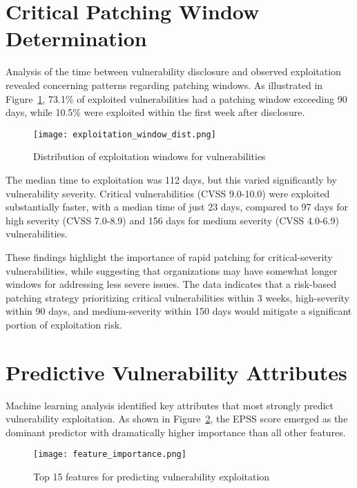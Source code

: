 \documentclass[runningheads]{llncs}
\begin{document}
\section{Critical Patching Window Determination}
Analysis of the time between vulnerability disclosure and observed exploitation revealed concerning patterns regarding patching windows. As illustrated in Figure~\ref{fig:patching_window}, 73.1\% of exploited vulnerabilities had a patching window exceeding 90 days, while 10.5\% were exploited within the first week after disclosure.

\begin{figure}[htbp]
\centering
\texttt{[image: exploitation\_window\_dist.png]}
\caption{Distribution of exploitation windows for vulnerabilities}
\label{fig:patching_window}
\end{figure}

The median time to exploitation was 112 days, but this varied significantly by vulnerability severity. Critical vulnerabilities (CVSS 9.0-10.0) were exploited substantially faster, with a median time of just 23 days, compared to 97 days for high severity (CVSS 7.0-8.9) and 156 days for medium severity (CVSS 4.0-6.9) vulnerabilities.

These findings highlight the importance of rapid patching for critical-severity vulnerabilities, while suggesting that organizations may have somewhat longer windows for addressing less severe issues. The data indicates that a risk-based patching strategy prioritizing critical vulnerabilities within 3 weeks, high-severity within 90 days, and medium-severity within 150 days would mitigate a significant portion of exploitation risk.

\section{Predictive Vulnerability Attributes}
Machine learning analysis identified key attributes that most strongly predict vulnerability exploitation. As shown in Figure~\ref{fig:predictive_attributes}, the EPSS score emerged as the dominant predictor with dramatically higher importance than all other features.

\begin{figure}[htbp]
\centering
\texttt{[image: feature\_importance.png]}
\caption{Top 15 features for predicting vulnerability exploitation}
\label{fig:predictive_attributes}
\end{figure}
\end{document}
